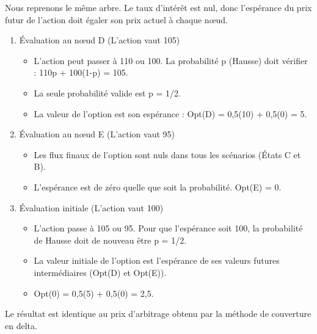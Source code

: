 \newpage

\begin{examplebox}
Nous reprenons le même arbre. Le taux d'intérêt est nul, donc l'espérance du prix futur de l'action doit égaler son prix actuel à chaque nœud.

\begin{enumerate}[label=Étape \arabic* :, leftmargin=*]
    \item Évaluation au nœud D (L'action vaut 105)
    \begin{itemize}[label=$\cdot$]
        \item L'action peut passer à 110 ou 100. La probabilité p (Hausse) doit vérifier : 110p + 100(1-p) = 105.
        \item La seule probabilité valide est p = 1/2.
        \item La valeur de l'option est son espérance : Opt(D) = 0,5(10) + 0,5(0) = 5.
    \end{itemize}

    \vspace{0.2cm}
    \item Évaluation au nœud E (L'action vaut 95)
    \begin{itemize}[label=$\cdot$]
        \item Les flux finaux de l'option sont nuls dans tous les scénarios (États C et B).
        \item L'espérance est de zéro quelle que soit la probabilité. Opt(E) = 0.
    \end{itemize}

    \vspace{0.2cm}
    \item Évaluation initiale (L'action vaut 100)
    \begin{itemize}[label=$\cdot$]
        \item L'action passe à 105 ou 95. Pour que l'espérance soit 100, la probabilité de Hausse doit de nouveau être p = 1/2.
        \item La valeur initiale de l'option est l'espérance de ses valeurs futures intermédiaires (Opt(D) et Opt(E)).
        \item Opt(0) = 0,5(5) + 0,5(0) = 2,5.
    \end{itemize}
\end{enumerate}
Le résultat est identique au prix d'arbitrage obtenu par la méthode de couverture en delta.
\end{examplebox}

